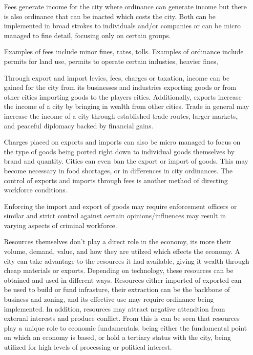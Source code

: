 Fees generate income for the city where ordinance can generate income but there is also ordinance that can be inacted which costs the city.
Both can be implemented in broad strokes to individuals and/or companies or can be micro managed to fine detail, focusing only on certain groups.

Examples of fees include minor fines, rates, tolls.
Examples of ordinance include permits for land use, permits to operate certain industies, heavier fines, 




Through export and import levies, fees, charges or taxation, income can be gained for the city from its businesses and industries exporting goods or from other cities importing goods to the players cities. Additionally, exports increase the income of a city by bringing in wealth from other cities. Trade in general may increase the income of a city through established trade routes, larger markets, and peaceful diplomacy backed by financial gains. 

Charges placed on exports and imports can also be micro managed to focus on the type of goods being ported right down to individual goods themselves by brand and quantity. Cities can even ban the export or import of goods. This may become necessary in food shortages, or in differences in city ordinances. The control of exports and imports through fees is another method of directing workforce conditions. 

Enforcing the import and export of goods may require enforcement officers or similar and strict control against certain opinions/influences may result in varying aspects of criminal workforce.



Resources themselves don't play a direct role in the economy, its more their volume, demand, value, and how they are utilzed which effects the economy. A city can take advantage to the resources it had available, giving it wealth through cheap materials or exports. Depending on technology, these resources can be obtained and used in different ways. Resources either imported of exported can be used to build or fund infrasture, their extraction can be the backbone of business and zoning, and its effective use may require ordinance being implemented. In addition, resources may attract negative attendtion from external interests and produce conflict. From this is can be seen that resources play a unique role to economic fundamentals, being either the fundamental point on which an economy is based, or hold a tertiary status with the city, being utilized for high levels of processing or political interest.


